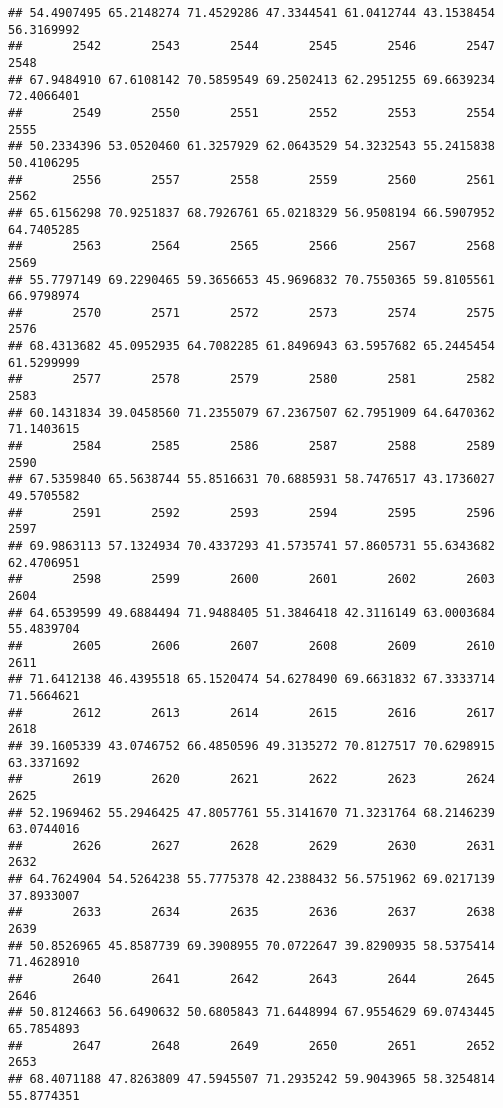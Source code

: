 \documentclass[
]{article}
\begin{document}
\begin{verbatim}
## 54.4907495 65.2148274 71.4529286 47.3344541 61.0412744 43.1538454 56.3169992 
##       2542       2543       2544       2545       2546       2547       2548 
## 67.9484910 67.6108142 70.5859549 69.2502413 62.2951255 69.6639234 72.4066401 
##       2549       2550       2551       2552       2553       2554       2555 
## 50.2334396 53.0520460 61.3257929 62.0643529 54.3232543 55.2415838 50.4106295 
##       2556       2557       2558       2559       2560       2561       2562 
## 65.6156298 70.9251837 68.7926761 65.0218329 56.9508194 66.5907952 64.7405285 
##       2563       2564       2565       2566       2567       2568       2569 
## 55.7797149 69.2290465 59.3656653 45.9696832 70.7550365 59.8105561 66.9798974 
##       2570       2571       2572       2573       2574       2575       2576 
## 68.4313682 45.0952935 64.7082285 61.8496943 63.5957682 65.2445454 61.5299999 
##       2577       2578       2579       2580       2581       2582       2583 
## 60.1431834 39.0458560 71.2355079 67.2367507 62.7951909 64.6470362 71.1403615 
##       2584       2585       2586       2587       2588       2589       2590 
## 67.5359840 65.5638744 55.8516631 70.6885931 58.7476517 43.1736027 49.5705582 
##       2591       2592       2593       2594       2595       2596       2597 
## 69.9863113 57.1324934 70.4337293 41.5735741 57.8605731 55.6343682 62.4706951 
##       2598       2599       2600       2601       2602       2603       2604 
## 64.6539599 49.6884494 71.9488405 51.3846418 42.3116149 63.0003684 55.4839704 
##       2605       2606       2607       2608       2609       2610       2611 
## 71.6412138 46.4395518 65.1520474 54.6278490 69.6631832 67.3333714 71.5664621 
##       2612       2613       2614       2615       2616       2617       2618 
## 39.1605339 43.0746752 66.4850596 49.3135272 70.8127517 70.6298915 63.3371692 
##       2619       2620       2621       2622       2623       2624       2625 
## 52.1969462 55.2946425 47.8057761 55.3141670 71.3231764 68.2146239 63.0744016 
##       2626       2627       2628       2629       2630       2631       2632 
## 64.7624904 54.5264238 55.7775378 42.2388432 56.5751962 69.0217139 37.8933007 
##       2633       2634       2635       2636       2637       2638       2639 
## 50.8526965 45.8587739 69.3908955 70.0722647 39.8290935 58.5375414 71.4628910 
##       2640       2641       2642       2643       2644       2645       2646 
## 50.8124663 56.6490632 50.6805843 71.6448994 67.9554629 69.0743445 65.7854893 
##       2647       2648       2649       2650       2651       2652       2653 
## 68.4071188 47.8263809 47.5945507 71.2935242 59.9043965 58.3254814 55.8774351 

\end{verbatim}
\end{document}
